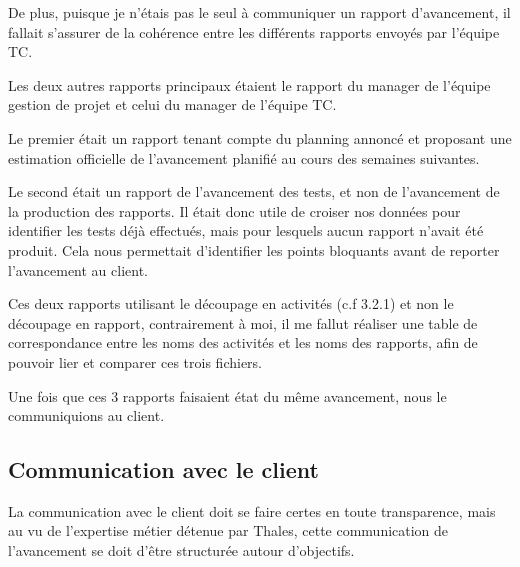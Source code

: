 De plus, puisque je n'étais pas le seul à communiquer un rapport d'avancement, il fallait s'assurer de la cohérence entre les différents rapports envoyés par l'équipe \gls{TC}.

Les deux autres rapports principaux étaient le rapport du manager de l'équipe gestion de projet et celui du manager de l'équipe \gls{TC}.

Le premier était un rapport tenant compte du planning annoncé et proposant une estimation officielle de l'avancement planifié au cours des semaines suivantes.

Le second était un rapport de l'avancement des tests, et non de l'avancement de la production des rapports. Il était donc utile de croiser nos données pour identifier les tests déjà effectués, mais pour lesquels aucun rapport n'avait été produit.
Cela nous permettait d'identifier les points bloquants avant de reporter l'avancement au client.

Ces deux rapports utilisant le découpage en activités (c.f 3.2.1) et non le découpage en rapport, contrairement à moi, il me fallut réaliser une table de correspondance entre les noms des activités et les noms des rapports, afin de pouvoir lier et comparer ces trois fichiers.

Une fois que ces 3 rapports faisaient état du même avancement, nous le communiquions au client.


\subsection{Communication avec le client}

La communication avec le client doit se faire certes en toute transparence, mais au vu de l'expertise métier détenue par Thales, cette communication de l'avancement se doit d'être structurée autour d'objectifs.

